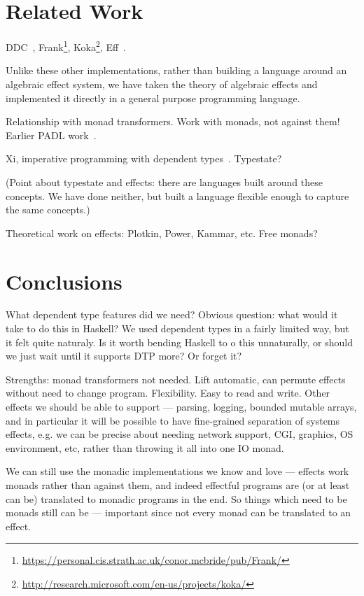 \section{Related Work}

\label{sect:related}

DDC~\cite{Lippmeier2009},
Frank\footnote{\url{https://personal.cis.strath.ac.uk/conor.mcbride/pub/Frank/}},
Koka\footnote{\url{http://research.microsoft.com/en-us/projects/koka/}},
Eff~\cite{Bauer,Pretnar2010}.

Unlike these other implementations, rather than building a language around
an algebraic effect system, we have taken the theory of algebraic effects and
implemented it directly in a general purpose programming language.

Relationship with monad transformers.  
Work with monads, not against them!
Earlier PADL work~\cite{bradyresource}.

Xi, imperative programming with dependent types~\cite{Xi2000}.
Typestate?~\cite{Strom1986,Aldrich2009}

(Point about typestate and effects: there are languages built around these
concepts.  We have done neither, but built a language flexible enough to
capture the same concepts.)

Theoretical work on effects: Plotkin, Power, Kammar, etc. Free monads?

\section{Conclusions}

\label{sect:conclusion}

What dependent type features did we need? Obvious question: what would
it take to do this in Haskell? We used dependent types in a fairly limited
way, but it felt quite naturaly. Is it worth bending Haskell to o this
unnaturally, or should we just wait until it supports DTP more? Or forget it?


Strengths: monad transformers not needed. Lift automatic, can permute effects
without need to change program. Flexibility. Easy to read and write.
Other effects we should be able to support --- parsing, logging, bounded
mutable arrays, and in particular
it will be possible to have fine-grained separation of systems effects, e.g.
we can be precise about needing network support, CGI, graphics, OS
environment, etc, rather than throwing it all into one IO monad.

We can still use the monadic implementations we know and love --- effects work
 monads rather than against them, and indeed effectful programs
are (or at least can be) translated to monadic programs in the end. So things
which need to be monads still can be --- important since not every monad
can be translated to an effect.

